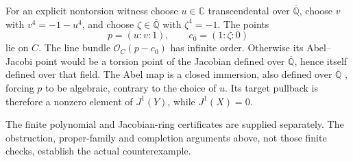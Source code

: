 For an explicit nontorsion witness choose
$u\in\mathbb C$ transcendental over
$\overline{\mathbb Q}$, choose $v$ with
$v^4=-1-u^4$, and choose
$\zeta\in\overline{\mathbb Q}$ with
$\zeta^4=-1$. The points
\[
                         p=(u:v:1),\qquad c_0=(1:\zeta:0)
\]
lie on $C$. The line bundle
$\mathcal O_C(p-c_0)$ has infinite order.
Otherwise its Abel--Jacobi point would be
a torsion point of the Jacobian defined
over $\overline{\mathbb Q}$, hence itself
defined over that field. The Abel map is
a closed immersion, also defined over
$\overline{\mathbb Q}$
\citep[Proposition 2.3, p.~7]{D_MilneJacobians2021},
forcing $p$ to be
algebraic, contrary to the choice of $u$.
Its target pullback is therefore a nonzero
element of $J^1(Y)$, while $J^1(X)=0$.

The finite polynomial and Jacobian-ring
certificates are supplied separately. The
obstruction, proper-family and completion
arguments above, not those finite checks,
establish the actual counterexample.
